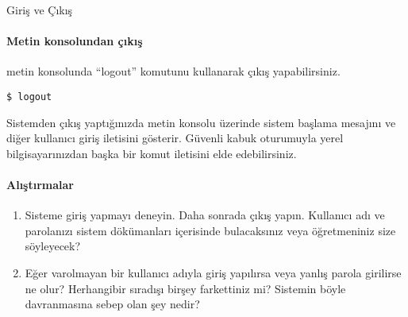 \begin{section}{Giriş ve Çıkış}
\paragraph{Metin konsolundan çıkış}{metin konsolunda “logout” komutunu kullanarak çıkış yapabilirsiniz.}

\begin{verbatim}
$ logout
\end{verbatim}

Sistemden çıkış yaptığınızda metin konsolu üzerinde sistem başlama mesajını ve diğer kullanıcı giriş iletisini gösterir. Güvenli kabuk oturumuyla yerel bilgisayarınızdan başka bir komut iletisini elde edebilirsiniz. 

\paragraph{{\Huge{\PencilLeftDown}}Alıştırmalar}{
\begin{enumerate}
 \item Sisteme giriş yapmayı deneyin. Daha sonrada çıkış yapın. Kullanıcı adı ve parolanızı sistem dökümanları içerisinde bulacaksınız veya öğretmeniniz size söyleyecek?
 \item Eğer varolmayan bir kullanıcı adıyla giriş yapılırsa veya yanlış parola girilirse ne olur? Herhangibir sıradışı birşey farkettiniz mi? Sistemin böyle davranmasına sebep olan şey nedir?
\end{enumerate}}
\end{section}

